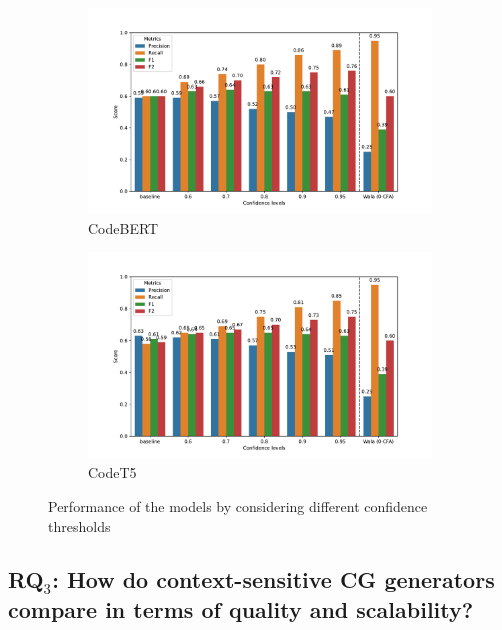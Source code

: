 \begin{figure}
    \begin{subfigure}[b]{\imgSize}
        \centering
        \includegraphics[width=\textwidth]{chapters/ch1/figs/codebert_rq2_1_fig.pdf}
        \caption{CodeBERT}
        \label{ch1:fig:cb-conf-lvl}
    \end{subfigure}
    \vspace{1em}
    
    \begin{subfigure}[b]{\imgSize}
        \centering
        \includegraphics[width=\textwidth]{chapters/ch1/figs/codet5_rq2_1_fig.pdf}
        \caption{CodeT5}
        \label{ch1:fig:models-threshold-t5}
    \end{subfigure}
	
    \caption{Performance of the models by considering different confidence thresholds}
    \label{ch1:fig:models-threshold}
\end{figure}

\subsection{\textbf{RQ}$_{3}$: How do context-sensitive CG generators compare in terms of quality and scalability?}

